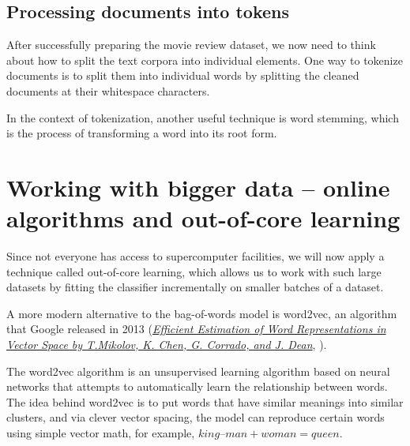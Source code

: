 \subsection{Processing documents into tokens}
After successfully preparing the movie review dataset, we now need to think about how to split the text corpora into individual elements. One way to tokenize documents is to split them into individual words by splitting the cleaned documents at their whitespace characters.

In the context of tokenization, another useful technique is word stemming, which is the process of transforming a word into its root form.
\section{Working with bigger data – online algorithms and out-of-core learning}
Since not everyone has access to supercomputer facilities, we will now apply a technique called out-of-core learning, which allows us to work with such large datasets by fitting the classifier incrementally on smaller batches of a dataset.

\begin{tcolorbox}[title=The word2vec model]
    A more modern alternative to the bag-of-words model is word2vec, an algorithm that Google released in 2013 (\href{https://arxiv.org/abs/1301.3781}{\textit{Efficient Estimation of Word Representations in Vector Space by T.Mikolov, K. Chen, G. Corrado, and J. Dean}}, ).

    The word2vec algorithm is an unsupervised learning algorithm based on neural networks that attempts to automatically learn the relationship between words. The idea behind word2vec is to put words that have similar meanings into similar clusters, and via clever vector spacing, the model can reproduce certain words using simple vector math, for example, $king – man + woman = queen$.
\end{tcolorbox}